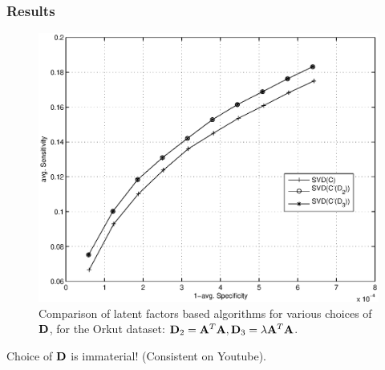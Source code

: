 \documentclass{beamer}
\begin{document}
\begin{frame}
\frametitle{Results}
\begin{figure}[h]
  \begin{center}
    \includegraphics[scale=0.3]{../paper/summarySVDOrkut.eps}
  \end{center}
  \caption{Comparison of latent factors based algorithms for various choices of $\mathbf{D}$, for the Orkut dataset: $\mathbf{D}_{2} = \mathbf{A}^{T}\mathbf{A}, \mathbf{D}_{3} = \lambda \mathbf{A}^{T}\mathbf{A}$.}
\end{figure}
\begin{itemize}
\pitem Choice of $\mathbf{D}$ is immaterial! (Consistent on Youtube).
\end{itemize}
\end{frame}
\end{document}
